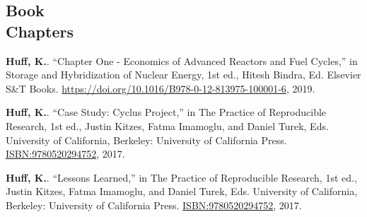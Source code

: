 \documentclass[margin,line]{resume}
\begin{document}
\begin{resume}
    \section{\mysidestyle Book\\Chapters}
      \begin{bibenum}
      \item \textbf{Huff, K.}. ``Chapter One - Economics of Advanced Reactors and Fuel
              Cycles,'' in Storage and Hybridization of Nuclear Energy, 1st
              ed., Hitesh Bindra, Ed. Elsevier S\&T Books.
              \url{https://doi.org/10.1016/B978-0-12-813975-100001-6}, 2019.
      \item \textbf{Huff, K.}. ``Case Study: Cyclus Project,'' in The Practice
              of Reproducible Research, 1st ed., Justin Kitzes, Fatma Imamoglu,
              and Daniel Turek, Eds. University of California, Berkeley:
              University of California Press.
              \href{https://www.ucpress.edu/book.php?isbn=9780520294752}{ISBN:9780520294752}, 2017.
      \item \textbf{Huff, K.}. ``Lessons Learned,'' in The Practice of Reproducible
              Research, 1st ed., Justin Kitzes, Fatma Imamoglu, and Daniel
              Turek, Eds. University of California, Berkeley: University of
              California Press.
              \href{https://www.ucpress.edu/book.php?isbn=9780520294752}{ISBN:9780520294752}, 2017.
      \end{bibenum}


\end{resume}
\end{document}
